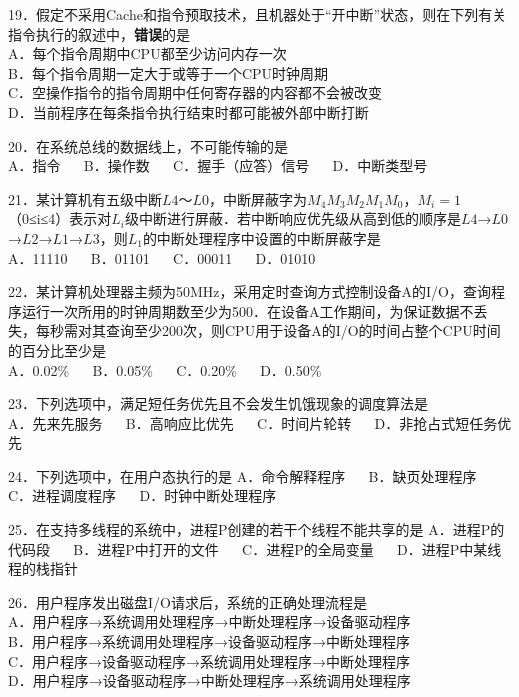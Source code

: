 19．假定不采用Cache和指令预取技术，且机器处于“开中断”状态，则在下列有关指令执行的叙述中，\textbf{错误}的是 \\
A．每个指令周期中CPU都至少访问内存一次 \\
B．每个指令周期一定大于或等于一个CPU时钟周期 \\
C．空操作指令的指令周期中任何寄存器的内容都不会被改变 \\
D．当前程序在每条指令执行结束时都可能被外部中断打断

20．在系统总线的数据线上，不可能传输的是 \\
A．指令 $\quad$ B．操作数 $\quad$ C．握手（应答）信号 $\quad$ D．中断类型号

21．某计算机有五级中断$L4$～$L0$，中断屏蔽字为$M_4M_3M_2M_1M_0$，$M_i=1$（0≤i≤4）表示对$L_i$级中断进行屏蔽．若中断响应优先级从高到低的顺序是$L4$→$L0$→$L2$→$L1$→$L3$，则$L_1$的中断处理程序中设置的中断屏蔽字是 \\
A．11110 $\quad$ B．01101 $\quad$ C．00011 $\quad$ D．01010

22．某计算机处理器主频为50MHz，采用定时查询方式控制设备A的I/O，查询程序运行一次所用的时钟周期数至少为500．在设备A工作期间，为保证数据不丢失，每秒需对其查询至少200次，则CPU用于设备A的I/O的时间占整个CPU时间的百分比至少是 \\
A．0.02\%  $\quad$ B．0.05\%  $\quad$ C．0.20\%  $\quad$ D．0.50\%

23．下列选项中，满足短任务优先且不会发生饥饿现象的调度算法是 \\
A．先来先服务 $\quad$ B．高响应比优先 $\quad$ C．时间片轮转 $\quad$ D．非抢占式短任务优先

24．下列选项中，在用户态执行的是
A．命令解释程序 $\quad$ B．缺页处理程序 $\quad$ C．进程调度程序 $\quad$ D．时钟中断处理程序

25．在支持多线程的系统中，进程P创建的若干个线程不能共享的是
A．进程P的代码段 $\quad$ B．进程P中打开的文件 $\quad$ C．进程P的全局变量 $\quad$ D．进程P中某线程的栈指针

26．用户程序发出磁盘I/O请求后，系统的正确处理流程是 \\
A．用户程序→系统调用处理程序→中断处理程序→设备驱动程序 \\
B．用户程序→系统调用处理程序→设备驱动程序→中断处理程序 \\
C．用户程序→设备驱动程序→系统调用处理程序→中断处理程序 \\
D．用户程序→设备驱动程序→中断处理程序→系统调用处理程序










